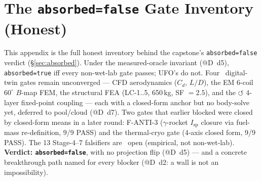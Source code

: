 \section{The \texttt{absorbed=false} Gate Inventory (Honest)}
\label{app:gateinv}

This appendix is the full honest inventory behind the capstone's
\texttt{absorbed=false} verdict (\S\ref{sec:absorbed}). Under the
measured-oracle invariant (@D~d5), \texttt{absorbed=true} iff every
non-wet-lab gate passes; UFO's do not. Four \tierOrange\ digital-twin
gates remain unconverged --- CFD aerodynamics ($C_d$, $L/D$), the EM
6-coil $60^{\circ}$ $B$-map FEM, the structural FEA (LC-1..5, 650\,kg,
SF $=2.5$), and the $\circlearrowleft$ 4-layer fixed-point coupling ---
each with a closed-form anchor but no body-solve yet, deferred to
pool/cloud (@D~d7). Two gates that earlier blocked were closed by
closed-form means in a later round: F-ANTI-3 ($\gamma$-rocket
$I_{\text{sp}}$ closure via fuel-mass re-definition, 9/9 PASS) and the
thermal-cryo gate (4-axis closed form, 9/9 PASS). The 13 Stage-4--7
falsifiers are \tierWhite\ open (empirical, not non-wet-lab).
\textbf{Verdict: \texttt{absorbed=false}}, with no projection flip
(@D~d5) --- and a concrete breakthrough path named for every blocker
(@D~d2: a wall is not an impossibility).

